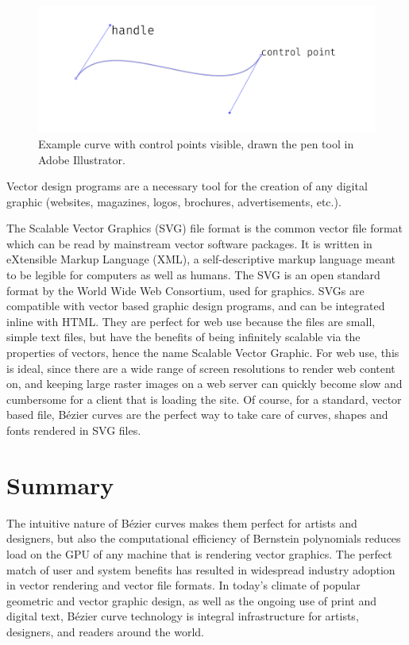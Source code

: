 \documentclass[12pt,letterpaper]{article}
\begin{document}
\begin{figure}[H]
    \centering
    \includegraphics[width=\textwidth]{illustrator-ex}
    \caption{Example curve with control points visible, drawn the pen tool in Adobe Illustrator.}
\end{figure}

Vector design programs are a necessary tool for the creation of any digital graphic (websites, magazines, logos, brochures, advertisements, etc.). 

The Scalable Vector Graphics (SVG) file format is the common vector file format which can be read by mainstream vector software packages. It is written in eXtensible Markup Language (XML), a self-descriptive markup language meant to be legible for computers as well as humans. The SVG is an open standard format by the World Wide Web Consortium, used for graphics. SVGs are compatible with vector based graphic design programs, and can be integrated inline with HTML. They are perfect for web use because the files are small, simple text files, but have the benefits of being infinitely scalable via the properties of vectors, hence the name Scalable Vector Graphic. For web use, this is ideal, since there are a wide range of screen resolutions to render web content on, and keeping large raster images on a web server can quickly become slow and cumbersome for a client that is loading the site. Of course, for a standard, vector based file, B\'ezier curves are the perfect way to take care of curves, shapes and fonts rendered in SVG files.

\section{Summary}
The intuitive nature of B\'ezier curves makes them perfect for artists and designers, but also the computational efficiency of Bernstein polynomials reduces load on the GPU of any machine that is rendering vector graphics. The perfect match of user and system benefits has resulted in widespread industry adoption in vector rendering and vector file formats. In today's climate of popular geometric and vector graphic design, as well as the ongoing use of print and digital text, B\'ezier curve technology is integral infrastructure for artists, designers, and readers around the world. %
\end{document}
